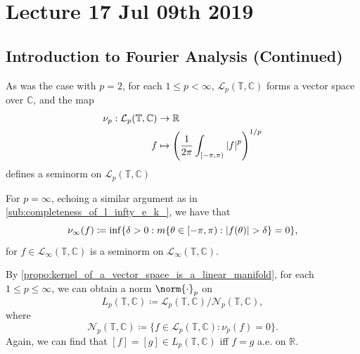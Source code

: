 \documentclass[notoc,notitlepage]{tufte-book}
\begin{document}


\chapter{Lecture 17 Jul 09th 2019}%
\label{chp:lecture_17_jul_09th_2019}

\section{Introduction to Fourier Analysis (Continued)}%
\label{sec:introduction_to_fourier_analysis_continued}

As was the case with $p = 2$, for each $1 \leq p < \infty$,
$\mathcal{L}_p(\mathbb{T}, \mathbb{C})$ forms a vector space over $\mathbb{C}$,
and the map
\begin{align*}
  \nu_p : \mathcal{L}_p(\mathbb{T}, \mathbb{C}) &\to \mathbb{R} \\
      f &\mapsto \left( \frac{1}{2 \pi} \int_{[-\pi, \pi)} \left|f\right|^p \right)^{1 / p}
\end{align*}
defines a seminorm on $\mathcal{L}_p(\mathbb{T}, \mathbb{C})$

For $p = \infty$, echoing a similar argument as in
\cref{sub:completeness_of_l_infty_e_k_}, we have that
\begin{equation*}
  \nu_\infty(f) \coloneqq \inf \{ \delta > 0 :
    m \{ \theta \in [-\pi, \pi) : \left|f(\theta)\right| > \delta \} = 0 \},
\end{equation*}
for $f \in \mathcal{L}_\infty(\mathbb{T}, \mathbb{C})$ is a seminorm
on $\mathcal{L}_\infty(\mathbb{T}, \mathbb{C})$.

By \cref{propo:kernel_of_a_vector_space_is_a_linear_manifold},
for each $1 \leq p \leq \infty$, we can obtain a norm $\norm{\cdot}_p$
on
\begin{equation*}
  L_p(\mathbb{T}, \mathbb{C})
  \coloneqq \mathcal{L}_p(\mathbb{T}, \mathbb{C}) \Big/
  \mathcal{N}_p(\mathbb{T}, \mathbb{C}),
\end{equation*}
where
\begin{equation*}
  \mathcal{N}_p(\mathbb{T}, \mathbb{C}) \coloneqq \{ f \in
  \mathcal{L}_p(\mathbb{T}, \mathbb{C}) : \nu_p(f) = 0 \}.
\end{equation*}
Again, we can find that $[f] = [g] \in L_p(\mathbb{T}, \mathbb{C})$
iff $f = g$ a.e. on $\mathbb{R}$.
\end{document}
